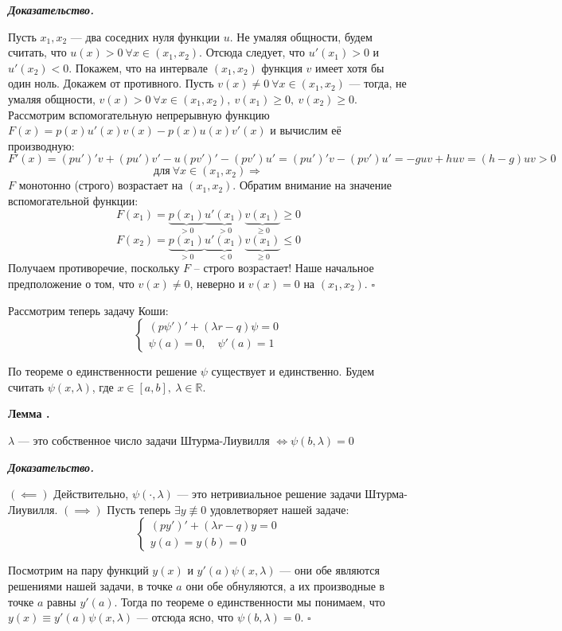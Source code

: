 \documentclass[11pt,a4paper]{report}
\numberwithin{equation}{section}
\numberwithin{figure}{chapter}
\numberwithin{table}{chapter}
\newif\ifinmathphysstatement
\newenvironment{mylemma}[1][]{%
    \refstepcounter{lemmactr}%
    \inmathphysstatementtrue
    \begin{tcolorbox}[mathphysblock,colframe=lemmacolor,colback=lemmacolor!3,#1]
    \textbf{\color{lemmacolor}Лемма \thelemmactr.}\par\smallskip
}{%
    \end{tcolorbox}
    \inmathphysstatementfalse
}
\newenvironment{myproof}{%
    \begin{tcolorbox}[mathphysblock,colframe=proofcolor!65,colback=proofcolor!2,boxrule=0.5pt]
    \textit{\textbf{Доказательство.}}\par\smallskip
}{%
    \hfill$\square$
    \end{tcolorbox}
}
\newcommand{\R}{\mathbb{R}}
\begin{document}
\begin{myproof}
    Пусть $x_1,x_2$ — два соседних нуля функции $u$. Не умаляя общности, будем считать, что $u(x)>0 \ \forall x\in(x_1,x_2) $. Отсюда следует, что $u'(x_1)>0$ и $u'(x_2)<0$. Покажем, что на интервале $(x_1,x_2)$ функция $v$ имеет хотя бы один ноль.
    Докажем от противного. Пусть $v(x)\neq0 \ \forall x\in(x_1,x_2) $ --- тогда, не умаляя общности, $v(x)>0 \ \forall x\in(x_1,x_2), \ v(x_1)\geq0, \ v(x_2)\geq 0$. Рассмотрим вспомогательную непрерывную функцию $F(x) = p(x)u'(x)v(x) - p(x)u(x)v'(x)$ и вычислим её производную:
    \[
F'(x) = (pu')'v+(pu')v'-u(pv')' -(pv')u'=(pu')'v-(pv')u' = -guv+huv=(h-g)uv
>0 \] \[ \text{для} \ \forall x\in(x_1,x_2) \Rightarrow\]$F$ монотонно (строго) возрастает на $(x_1,x_2) $. Обратим внимание на значение вспомогательной функции:
\[F(x_1) = \underbrace{p(x_1)}_{>0}\underbrace{u'(x_1)}_{>0}\underbrace{v(x_1)}_{\geq0}\geq0\]
\[F(x_2) = \underbrace{p(x_1)}_{>0}\underbrace{u'(x_1)}_{<0}\underbrace{v(x_1)}_{\geq0}\leq0
\]
Получаем противоречие, поскольку $F$ -- строго возрастает! Наше начальное предположение о том, что $v(x)\neq0$, неверно и $v(x)=0$ на $(x_1,x_2) $.
\end{myproof}

Рассмотрим теперь задачу Коши:
\[
\begin{cases}
    (p\psi')' + (\lambda r - q)\psi = 0\\
    \psi(a) = 0, \quad \psi'(a) = 1
\end{cases}
\]

По теореме о единственности решение $\psi$ существует и единственно.
Будем считать $\psi(x,\lambda)$, где $x\in[a,b], \ \lambda\in\R$.



\begin{mylemma}
    $\lambda$ --- это собственное число задачи Штурма-Лиувилля $ \Leftrightarrow \psi(b,\lambda) = 0$
\end{mylemma}


\begin{myproof}
    $\mathbf{(\impliedby)}$ Действительно,  $\psi(\cdot,\lambda)$ --- это нетривиальное решение задачи Штурма-Лиувилля.
    $\mathbf{(\implies)}$ Пусть теперь $\exists y\not\equiv0$ удовлетворяет нашей задаче:
\[
\begin{cases}
    (py')' + (\lambda r - q)y = 0\\
    y(a) = y(b) = 0
\end{cases}
\]

Посмотрим на пару функций $y(x)$ и $y'(a)\psi(x,\lambda)$ --- они обе являются решениями нашей задачи, в точке $a$ они обе обнуляются, а их производные в точке $a$ равны $y'(a)$. Тогда по теореме о единственности мы понимаем, что $y(x)\equiv y'(a)\psi(x,\lambda)$ --- отсюда ясно, что $\psi(b,\lambda) = 0$.
\end{myproof}
\end{document}
